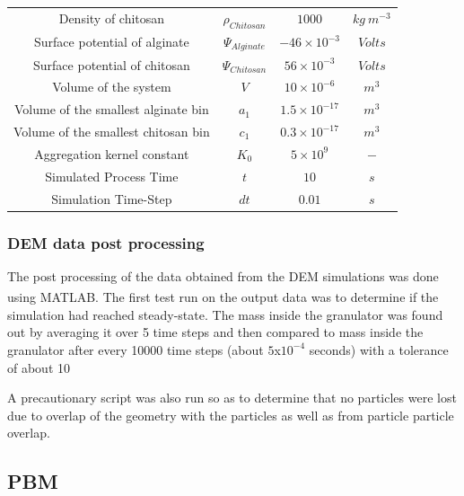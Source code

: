 \documentclass[preprint,11pt,authoryear]{elsarticle}
\begin{document}
\begin{table}[!htb][H]
\begin{center}
\begin{tabular}{c|c|c|c}
	Density of chitosan & $\rho_{Chitosan}$ & $1000$ & $kg~m^{-3}$ \\
	Surface potential of alginate & $\Psi_{Alginate}$ & $-46 \times 10^{-3}$ & $Volts$\\
	Surface potential of chitosan & $\Psi_{Chitosan}$ & $56 \times 10^{-3}$ & $Volts$\\
	Volume of the system & $V$ & $10\times10^{-6}$ & $m^3$\\
	Volume of the smallest alginate bin & $a_1$ & $1.5 \times 10^{-17}$ & $m^{3}$\\
	Volume of the smallest chitosan bin & $c_1$ & $0.3 \times 10^{-17}$ & $m^{3}$ \\
	Aggregation kernel constant & $K_0$ & $5 \times 10^{9}$ & $-$\\
	Simulated Process Time & $t$ & $10$ & $s$\\
	Simulation Time-Step & $dt$ & $0.01$ & $s$\\
	\hline
	\end{tabular}
	\end{center}
	\end{table}

	    \subsubsection{DEM data post processing}
	    \par The post processing of the data obtained from the DEM simulations was done using MATLAB\textsuperscript{\textregistered}. The first test run on the output data was to determine if the simulation had reached steady-state. The mass inside the granulator was found out by averaging it over 5 time steps and then compared to mass inside the granulator after every 10000 time steps (about $5$x$10^{-4}$ seconds) with a tolerance of about 10%
	    \par A precautionary script was also run so as to determine that no particles were lost due to overlap of the geometry with the particles as well as from particle particle overlap.
	     
	    
	  \subsection{PBM}
\end{document}
